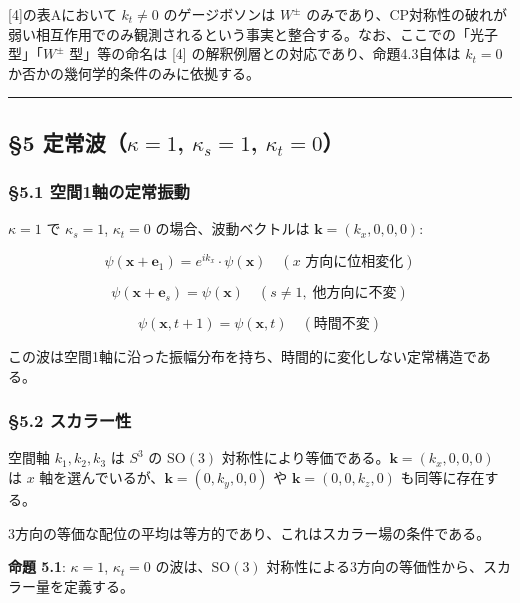\documentclass[
  a4paper,11pt]{ltjsarticle}
\theoremstyle{definition}
\theoremstyle{remark}
\begin{document}
{[}4{]}の表Aにおいて \(k_t \neq 0\) のゲージボソンは \(W^{\pm}\)
のみであり、CP対称性の破れが弱い相互作用でのみ観測されるという事実と整合する。なお、ここでの「光子型」「\(W^{\pm}\)
型」等の命名は {[}4{]} の解釈例層との対応であり、命題4.3自体は
\(k_t = 0\) か否かの幾何学的条件のみに依拠する。

\begin{center}\rule{0.5\linewidth}{0.5pt}\end{center}

\subsection{\texorpdfstring{§5 定常波（\(\kappa = 1\), \(\kappa_s = 1\),
\(\kappa_t = 0\)）}{§5 定常波（\textbackslash kappa = 1, \textbackslash kappa\_s = 1, \textbackslash kappa\_t = 0）}}\label{ux5b9aux5e38ux6ce2kappa-1-kappa_s-1-kappa_t-0}

\subsubsection{§5.1
空間1軸の定常振動}\label{ux7a7aux95931ux8ef8ux306eux5b9aux5e38ux632fux52d5}

\(\kappa = 1\) で \(\kappa_s = 1\), \(\kappa_t = 0\)
の場合、波動ベクトルは \(\mathbf{k} = (k_x, 0, 0, 0)\):

\[\psi(\mathbf{x} + \mathbf{e}_1) = e^{ik_x} \cdot \psi(\mathbf{x}) \quad (\text{$x$ 方向に位相変化})\]

\[\psi(\mathbf{x} + \mathbf{e}_s) = \psi(\mathbf{x}) \quad (s \neq 1,\; \text{他方向に不変})\]

\[\psi(\mathbf{x}, t + 1) = \psi(\mathbf{x}, t) \quad (\text{時間不変})\]

この波は空間1軸に沿った振幅分布を持ち、時間的に変化しない定常構造である。

\subsubsection{§5.2 スカラー性}\label{ux30b9ux30abux30e9ux30fcux6027}

空間軸 \(k_1, k_2, k_3\) は \(S^3\) の \(\mathrm{SO}(3)\)
対称性により等価である。\(\mathbf{k} = (k_x, 0, 0, 0)\) は \(x\)
軸を選んでいるが、\(\mathbf{k} = (0, k_y, 0, 0)\) や
\(\mathbf{k} = (0, 0, k_z, 0)\) も同等に存在する。

3方向の等価な配位の平均は等方的であり、これはスカラー場の条件である。

\textbf{命題 5.1}: \(\kappa = 1\), \(\kappa_t = 0\)
の波は、\(\mathrm{SO}(3)\)
対称性による3方向の等価性から、スカラー量を定義する。
\end{document}
